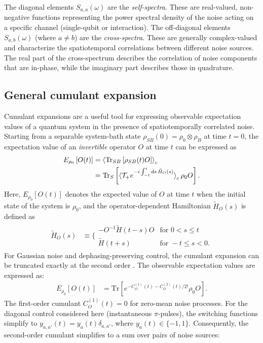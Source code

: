 \documentclass[%
 reprint,
superscriptaddress,
 amsmath,amssymb,
 aps,
pra,
floatfix,
]{revtex4-2}
\begin{document}
The diagonal elements $S_{a,a}(\omega)$ are the \textit{self-spectra}. These are real-valued, non-negative functions representing the power spectral density of the noise acting on a specific channel (single-qubit or interaction). The off-diagonal elements $S_{a,b}(\omega)$ (where $a \neq b$) are the \textit{cross-spectra}. These are generally complex-valued and characterize the spatiotemporal correlations between different noise sources. The real part of the cross-spectrum describes the correlation of noise components that are in-phase, while the imaginary part describes those in quadrature.

\subsection{General cumulant expansion}
\label{app::cumu}
Cumulant expansions are a useful tool for expressing observable expectation values of a quantum system in the presence of spatiotemporally correlated noise. Starting from a separable system-bath state $\rho_{SB}(0)=\rho_0\otimes\rho_B$ at time $t=0$, the expectation value of an \textit{invertible} operator $O$ at time $t$ can be expressed as \cite{PhysRevA.95.022121}
\begin{align} 
    E_{\rho_0}\left[O(t)\right]&=\braket{\text{Tr}_{SB}\left[\rho_{SB}(t)O\right]}_c \nonumber\\
    &=\text{Tr}_{S}\left[\braket{\mathcal{T}_+e^{-i\int_{-t}^tds\,\tilde{H}_O(s)}}_{c}\rho_{0}O\right].
\end{align}
Here, $E_{\rho_0}[O(t)]$ denotes the expected value of $O$ at time $t$ when the initial state of the system is $\rho_0$, and the operator-dependent Hamiltonian $\tilde{H}_O(s)$ is defined as
\begin{align}
    \tilde{H}_O(s)&\equiv\Bigg\{\begin{matrix}
        -O^{-1}\tilde{H}(t-s)O & \text{for }0<s\leq t\\
        \tilde{H}(t+s) & \text{for }-t\leq s < 0.
    \end{matrix}
\end{align}
For Gaussian noise and dephasing-preserving control, the cumulant expansion can be truncated exactly at the second order \cite{CombMultiaxis}. The observable expectation values are expressed as:
\begin{align}
\label{eq::expcumu}
    E_{\rho_0}[O(t)]&=\text{Tr}\left[e^{-C_O^{(1)}(t)-C_O^{(2)}(t)/2!}\rho_0 O\right].
\end{align}
The first-order cumulant $C_O^{(1)}(t)=0$ for zero-mean noise processes. For the diagonal control considered here (instantaneous $\pi$-pulses), the switching functions simplify to $y_{a,a'}(t) = y_a(t)\delta_{a,a'}$, where $y_a(t) \in \{-1, 1\}$. Consequently, the second-order cumulant simplifies to a sum over pairs of noise sources:
\end{document}
